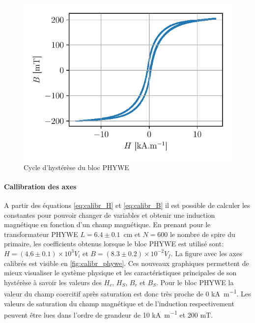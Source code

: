 \begin{minipage}{\linewidth}
    \begin{figure}
        \includegraphics[width=\linewidth]{figures/G1-phywe-avec-bloc_chang.pdf}
        \caption{Cycle d'hystérèse du bloc PHYWE}
        \label{fig:calibr_phywe}
    \end{figure}
    
    \paragraph{Callibration des axes}
    A partir des équations \autoref{eq:calibr_H} et \autoref{eq:calibr_B} il est possible de calculer les constantes pour pouvoir changer de variables et obtenir une induction magnétique en fonction d'un champ magnétique. En prenant pour le transformateur PHYWE \mbox{\(L = 6.4 \pm 0.1\) \si{\centi \meter}} et \(N = 600\) le nombre de spire du primaire, les coefficients obtenus lorsque le bloc PHYWE est utilisé sont: \mbox{\(H = (4.6\pm0.1)\times10^3 V_i\)} et \mbox{\(B = (8.3\pm0.2)\times10^{-2} V_f\)}. La figure avec les axes calibrés est visible en \autoref{fig:calibr_phywe}.
    Ces nouveaux graphiques permettent de mieux visualiser le système physique et les caractéristiques principales de son hystérèse à savoir les valeurs des \(H_c\), \(H_S\), \(B_r\) et \(B_S\). Pour le bloc PHYWE la valeur du champ coercitif après saturation est donc très proche de 0 \si{\kilo\ampere\per\meter}. Les valeurs de saturation  du champ magnétique et de l'induction respectivement peuvent être lues dans l'ordre de grandeur de 10 \si{\kilo\ampere\per\meter} et 200 \si{\milli\tesla}.
\end{minipage}

